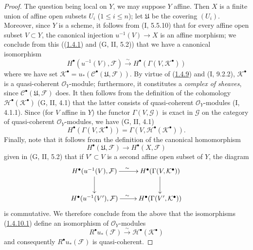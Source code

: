 \begin{proof}
The question being local on $Y$, we may suppose $Y$ affine. Then $X$ is a
finite union of affine open subsets $U_i$ ($1\leq i\leq n$); let
$\mathfrak U$ be the covering $(U_i)$. Moreover, since $Y$ is a scheme,
it follows from (I, 5.5.10) that for every affine open subset $V\subset Y$,
the canonical injection $u^{-1}(V)\to X$ is an affine morphism; we
conclude from this ((\hyperref[III.1.4.1]{1.4.1}) and (G, II, 5.2)) that
we have a canonical isomorphism
\begin{equation}
\label{III.1.4.10.1}
\tag{1.4.10.1}
H^\bullet(u^{-1}(V),\mathcal F)
\xrightarrow{\sim}H^\bullet(\Gamma(V,\mathcal K^\bullet))
\end{equation}
where we have set
$\mathcal K^\bullet=u_*(\mathcal C^\bullet(\mathfrak U,\mathcal F))$. By
virtue of (\hyperref[III.1.4.9]{1.4.9}) and (I, 9.2.2),
$\mathcal K^\bullet$ is a quasi-coherent $\mathcal O_Y$-module; furthermore,
it constitutes a \emph{complex of sheaves}, since
$\mathcal C^\bullet(\mathfrak U,\mathcal F)$ does. It then follows from the
definition of the cohomology
$\mathcal H^\bullet(\mathcal K^\bullet)$ (G, II, 4.1) that the latter
consists of quasi-coherent $\mathcal O_Y$-modules (I, 4.1.1). Since (for $V$
affine in $Y$) the functor $\Gamma(V,\mathcal G)$ is exact in
$\mathcal G$ on the category of quasi-coherent $\mathcal O_Y$-modules,
we have (G, II, 4.1)
\begin{equation}
\label{III.1.4.10.2}
\tag{1.4.10.2}
H^\bullet(\Gamma(V,\mathcal K^\bullet))
=\Gamma(V,\mathcal H^\bullet(\mathcal K^\bullet)).
\end{equation}
Finally, note that it follows from the definition of the canonical
homomorphism
\[
H^\bullet(\mathfrak U,\mathcal F)\longrightarrow H^\bullet(X,\mathcal F)
\]
given in (G, II, 5.2) that if $V'\subset V$ is a second affine open subset
of $Y$, the diagram
\[
\xymatrix{
H^\bullet(u^{-1}(V),\mathcal F)\ar[r]^{\sim}\ar[d]
&H^\bullet(\Gamma(V,\mathcal K^\bullet))\ar[d]\\
H^\bullet(u^{-1}(V'),\mathcal F)\ar[r]^{\sim}
&H^\bullet(\Gamma(V',\mathcal K^\bullet))
}
\]
is commutative. We therefore conclude from the above that the isomorphisms
(\hyperref[III.1.4.10.1]{1.4.10.1}) define an isomorphism of
$\mathcal O_Y$-modules
\begin{equation}
\label{III.1.4.10.3}
\tag{1.4.10.3}
R^\bullet u_*(\mathcal F)
\xrightarrow{\sim}\mathcal H^\bullet(\mathcal K^\bullet)
\end{equation}
and consequently $R^\bullet u_*(\mathcal F)$ is quasi-coherent.
\end{proof}


